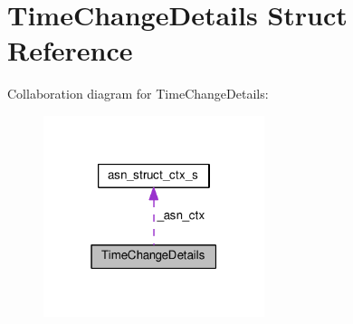 \hypertarget{structTimeChangeDetails}{}\section{Time\+Change\+Details Struct Reference}
\label{structTimeChangeDetails}


Collaboration diagram for Time\+Change\+Details\+:\nopagebreak
\begin{figure}[H]
\begin{center}
\leavevmode
\includegraphics[width=183pt]{structTimeChangeDetails__coll__graph}
\end{center}
\end{figure}
